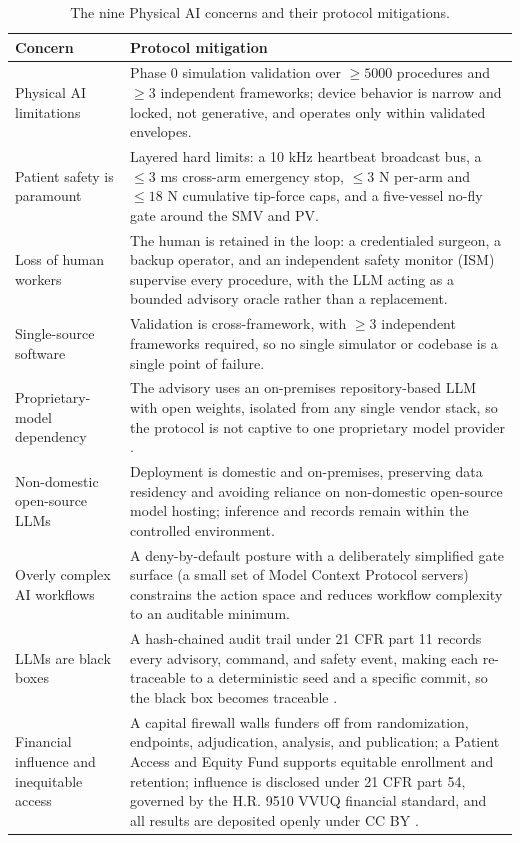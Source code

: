 \vspace{0.3em}

\begin{table}[t]\centering\footnotesize
\caption{The nine Physical AI concerns and their protocol mitigations.}
\label{tab:concerns}
\begin{tabularx}{\textwidth}{L{5.5cm} Y}
\toprule
\textbf{Concern} & \textbf{Protocol mitigation} \\
\midrule
Physical AI limitations & Phase 0 simulation validation over $\geq 5000$ procedures and $\geq 3$ independent frameworks; device behavior is narrow and locked, not generative, and operates only within validated envelopes. \\
Patient safety is paramount & Layered hard limits: a 10 kHz heartbeat broadcast bus, a $\leq 3$ ms cross-arm emergency stop, $\leq 3$ N per-arm and $\leq 18$ N cumulative tip-force caps, and a five-vessel no-fly gate around the SMV and PV. \\
Loss of human workers & The human is retained in the loop: a credentialed surgeon, a backup operator, and an independent safety monitor (ISM) supervise every procedure, with the LLM acting as a bounded advisory oracle rather than a replacement. \\
Single-source software & Validation is cross-framework, with $\geq 3$ independent frameworks required, so no single simulator or codebase is a single point of failure. \\
Proprietary-model dependency & The advisory uses an on-premises repository-based LLM with open weights, isolated from any single vendor stack, so the protocol is not captive to one proprietary model provider \cite{kawchak2025codegen16}. \\
Non-domestic open-source LLMs & Deployment is domestic and on-premises, preserving data residency and avoiding reliance on non-domestic open-source model hosting; inference and records remain within the controlled environment. \\
Overly complex AI workflows & A deny-by-default posture with a deliberately simplified gate surface (a small set of Model Context Protocol servers) constrains the action space and reduces workflow complexity to an auditable minimum. \\
LLMs are black boxes & A hash-chained audit trail under 21 CFR part 11 records every advisory, command, and safety event, making each re-traceable to a deterministic seed and a specific commit, so the black box becomes traceable \cite{kawchak2026adapt312}. \\
Financial influence and inequitable access & A capital firewall walls funders off from randomization, endpoints, adjudication, analysis, and publication; a Patient Access and Equity Fund supports equitable enrollment and retention; influence is disclosed under 21 CFR part 54, governed by the H.R. 9510 VVUQ financial standard, and all results are deposited openly under CC BY \cite{kawchak2026hr9510,ecfr2026part54}. \\
\bottomrule
\end{tabularx}
\end{table}


